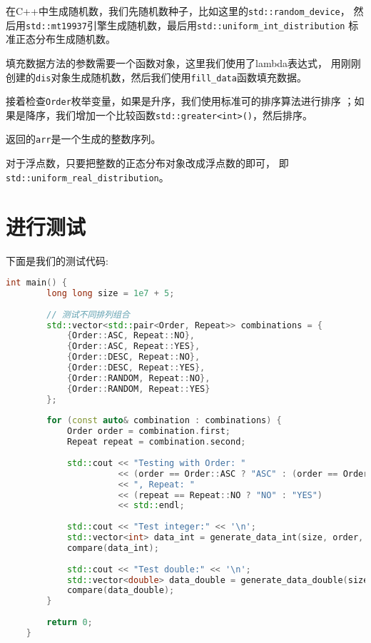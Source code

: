 \documentclass[UTF8]{ctexart}
\begin{document}
在C++中生成随机数，我们先随机数种子，比如这里的\texttt{std::random\_device}，
然后用\texttt{std::mt19937}引擎生成随机数，最后用\texttt{std::uniform\_int\_distribution}
标准正态分布生成随机数。

填充数据方法的参数需要一个函数对象，这里我们使用了lambda表达式，
用刚刚创建的\texttt{dis}对象生成随机数，然后我们使用\texttt{fill\_data}函数填充数据。

接着检查\texttt{Order}枚举变量，如果是升序，我们使用标准可的排序算法进行排序
；如果是降序，我们增加一个比较函数\texttt{std::greater<int>()}，然后排序。

返回的\texttt{arr}是一个生成的整数序列。

对于浮点数，只要把整数的正态分布对象改成浮点数的即可，
即\texttt{std::uniform\_real\_distribution}。

\section{进行测试}

下面是我们的测试代码: 

\begin{lstlisting}[language=C++]
    int main() {
        long long size = 1e7 + 5;
    
        // 测试不同排列组合
        std::vector<std::pair<Order, Repeat>> combinations = {
            {Order::ASC, Repeat::NO},
            {Order::ASC, Repeat::YES},
            {Order::DESC, Repeat::NO},
            {Order::DESC, Repeat::YES},
            {Order::RANDOM, Repeat::NO},
            {Order::RANDOM, Repeat::YES}
        };
    
        for (const auto& combination : combinations) {
            Order order = combination.first;
            Repeat repeat = combination.second;
    
            std::cout << "Testing with Order: " 
                      << (order == Order::ASC ? "ASC" : (order == Order::DESC ? "DESC" : "RANDOM"))
                      << ", Repeat: " 
                      << (repeat == Repeat::NO ? "NO" : "YES") 
                      << std::endl;
    
            std::cout << "Test integer:" << '\n';
            std::vector<int> data_int = generate_data_int(size, order, repeat);
            compare(data_int);
    
            std::cout << "Test double:" << '\n';
            std::vector<double> data_double = generate_data_double(size, order, repeat);
            compare(data_double);
        }
    
        return 0;
    }
\end{lstlisting}
\end{document}
